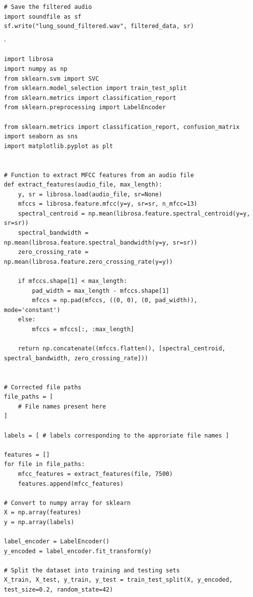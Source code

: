 \documentclass[conference]{IEEEtran}
\begin{document}
{\begin{lstlisting}[style=mypython, caption={Master Algorithm with Amplification}, label={lst:master-algorithm}]
# Save the filtered audio
import soundfile as sf
sf.write("lung_sound_filtered.wav", filtered_data, sr)

\end{lstlisting}











'

\begin{lstlisting}[style=mypython, caption={Python code for SVM Model}]
import librosa
import numpy as np
from sklearn.svm import SVC
from sklearn.model_selection import train_test_split
from sklearn.metrics import classification_report
from sklearn.preprocessing import LabelEncoder

from sklearn.metrics import classification_report, confusion_matrix
import seaborn as sns
import matplotlib.pyplot as plt


# Function to extract MFCC features from an audio file
def extract_features(audio_file, max_length):
    y, sr = librosa.load(audio_file, sr=None)
    mfccs = librosa.feature.mfcc(y=y, sr=sr, n_mfcc=13)
    spectral_centroid = np.mean(librosa.feature.spectral_centroid(y=y, sr=sr))
    spectral_bandwidth = np.mean(librosa.feature.spectral_bandwidth(y=y, sr=sr))
    zero_crossing_rate = np.mean(librosa.feature.zero_crossing_rate(y=y))
    
    if mfccs.shape[1] < max_length:
        pad_width = max_length - mfccs.shape[1]
        mfccs = np.pad(mfccs, ((0, 0), (0, pad_width)), mode='constant')
    else:
        mfccs = mfccs[:, :max_length]
        
    return np.concatenate((mfccs.flatten(), [spectral_centroid, spectral_bandwidth, zero_crossing_rate]))


# Corrected file paths
file_paths = [
    # File names present here
]

labels = [ # labels corresponding to the approriate file names ]

features = []
for file in file_paths:
    mfcc_features = extract_features(file, 7500)
    features.append(mfcc_features)

# Convert to numpy array for sklearn
X = np.array(features)
y = np.array(labels)

label_encoder = LabelEncoder()
y_encoded = label_encoder.fit_transform(y)

# Split the dataset into training and testing sets
X_train, X_test, y_train, y_test = train_test_split(X, y_encoded, test_size=0.2, random_state=42)


\end{lstlisting}}
\end{document}
